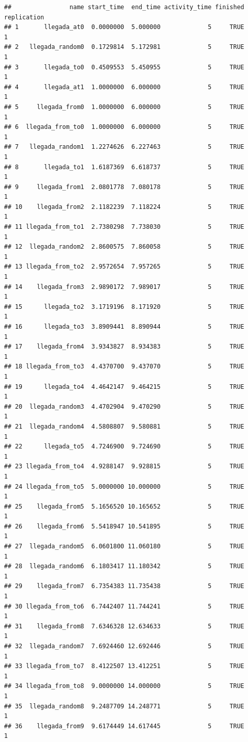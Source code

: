 \documentclass[
]{book}
\theoremstyle{definition}
\theoremstyle{definition}
\theoremstyle{definition}
\theoremstyle{definition}
\theoremstyle{remark}
\begin{document}
\begin{verbatim}
##                name start_time  end_time activity_time finished replication
## 1       llegada_at0  0.0000000  5.000000             5     TRUE           1
## 2   llegada_random0  0.1729814  5.172981             5     TRUE           1
## 3       llegada_to0  0.4509553  5.450955             5     TRUE           1
## 4       llegada_at1  1.0000000  6.000000             5     TRUE           1
## 5     llegada_from0  1.0000000  6.000000             5     TRUE           1
## 6  llegada_from_to0  1.0000000  6.000000             5     TRUE           1
## 7   llegada_random1  1.2274626  6.227463             5     TRUE           1
## 8       llegada_to1  1.6187369  6.618737             5     TRUE           1
## 9     llegada_from1  2.0801778  7.080178             5     TRUE           1
## 10    llegada_from2  2.1182239  7.118224             5     TRUE           1
## 11 llegada_from_to1  2.7380298  7.738030             5     TRUE           1
## 12  llegada_random2  2.8600575  7.860058             5     TRUE           1
## 13 llegada_from_to2  2.9572654  7.957265             5     TRUE           1
## 14    llegada_from3  2.9890172  7.989017             5     TRUE           1
## 15      llegada_to2  3.1719196  8.171920             5     TRUE           1
## 16      llegada_to3  3.8909441  8.890944             5     TRUE           1
## 17    llegada_from4  3.9343827  8.934383             5     TRUE           1
## 18 llegada_from_to3  4.4370700  9.437070             5     TRUE           1
## 19      llegada_to4  4.4642147  9.464215             5     TRUE           1
## 20  llegada_random3  4.4702904  9.470290             5     TRUE           1
## 21  llegada_random4  4.5808807  9.580881             5     TRUE           1
## 22      llegada_to5  4.7246900  9.724690             5     TRUE           1
## 23 llegada_from_to4  4.9288147  9.928815             5     TRUE           1
## 24 llegada_from_to5  5.0000000 10.000000             5     TRUE           1
## 25    llegada_from5  5.1656520 10.165652             5     TRUE           1
## 26    llegada_from6  5.5418947 10.541895             5     TRUE           1
## 27  llegada_random5  6.0601800 11.060180             5     TRUE           1
## 28  llegada_random6  6.1803417 11.180342             5     TRUE           1
## 29    llegada_from7  6.7354383 11.735438             5     TRUE           1
## 30 llegada_from_to6  6.7442407 11.744241             5     TRUE           1
## 31    llegada_from8  7.6346328 12.634633             5     TRUE           1
## 32  llegada_random7  7.6924460 12.692446             5     TRUE           1
## 33 llegada_from_to7  8.4122507 13.412251             5     TRUE           1
## 34 llegada_from_to8  9.0000000 14.000000             5     TRUE           1
## 35  llegada_random8  9.2487709 14.248771             5     TRUE           1
## 36    llegada_from9  9.6174449 14.617445             5     TRUE           1
\end{verbatim}
\end{document}
